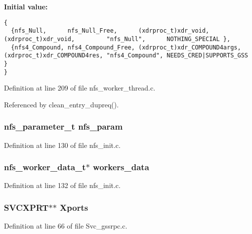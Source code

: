 {\bf Initial value:}

\footnotesize\begin{verbatim} 
{
  {nfs_Null,      nfs_Null_Free,      (xdrproc_t)xdr_void,          (xdrproc_t)xdr_void,         "nfs_Null",      NOTHING_SPECIAL },
  {nfs4_Compound, nfs4_Compound_Free, (xdrproc_t)xdr_COMPOUND4args, (xdrproc_t)xdr_COMPOUND4res, "nfs4_Compound", NEEDS_CRED|SUPPORTS_GSS }
}
\end{verbatim}\normalsize 


Definition at line 209 of file nfs\_\-worker\_\-thread.c.

Referenced by clean\_\-entry\_\-dupreq().
\subsubsection{\setlength{\rightskip}{0pt plus 5cm}nfs\_\-parameter\_\-t {\bf nfs\_\-param}}\label{nfs__worker__thread_8c_a3}




Definition at line 130 of file nfs\_\-init.c.
\subsubsection{\setlength{\rightskip}{0pt plus 5cm}nfs\_\-worker\_\-data\_\-t$\ast$ {\bf workers\_\-data}}\label{nfs__worker__thread_8c_a2}




Definition at line 132 of file nfs\_\-init.c.
\subsubsection{\setlength{\rightskip}{0pt plus 5cm}SVCXPRT$\ast$$\ast$ {\bf Xports}}\label{nfs__worker__thread_8c_a4}




Definition at line 66 of file Svc\_\-gssrpc.c.